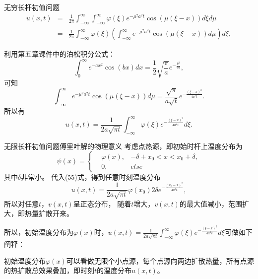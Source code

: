 \documentclass[11pt]{beamer}
\begin{document}
\begin{frame}{无穷长杆初值问题}
\begin{eqnarray}
u(x,t) &=& \frac{1}{2\pi} \int^\infty_{-\infty} \int^\infty_{-\infty} \varphi(\xi) e^{-\mu^2 a^2 t} \cos(\mu(\xi-x)) d\xi d\mu \nonumber\\
&=& \frac{1}{2\pi} \int^\infty_{-\infty} \varphi(\xi) (\int^\infty_{-\infty} e^{-\mu^2 a^2 t} \cos(\mu(\xi-x)) d\mu) d\xi,
\end{eqnarray}

利用第五章课件中的泊松积分公式：
\begin{equation}
\int^\infty_0 e^{-ax^2} \cos(bx) dx = \frac{1}{2} \sqrt{\frac{\pi}{a}} e^{-\frac{b^2}{4a}},
\end{equation}
可知
\begin{equation}
\int^\infty_{-\infty} e^{-\mu^2 a^2 t} \cos(\mu(\xi-x)) d\mu = \frac{\sqrt{\pi}}{a \sqrt{t}} e^{- \frac{(\xi-x)^2}{4 a^2 t}}.
\end{equation}
所以有
\begin{equation}
u(x,t) = \frac{1}{2a\sqrt{\pi t}} \int^\infty_{-\infty} \varphi(\xi) e^{- \frac{(\xi-x)^2}{4a^2 t}} d\xi.
\end{equation}

\end{frame}

\begin{frame}{无限长杆初值问题傅里叶解的物理意义}
考虑点热源，即初始时杆上温度分布为
\begin{equation}
\psi(x) = \left\{
\begin{aligned}
&\varphi(x), &-\delta + x_0 < x < x_0 + \delta, \\
&0, &else
\end{aligned}
\right.
\end{equation}
其中$\delta$非常小。
代入(55)式，得到任意时刻温度分布
\begin{equation}
u(x,t) = \frac{1}{2a\sqrt{\pi t}} \varphi(x_0) 2\delta e^{- \frac{(x_0 - x)^2}{4a^2 t}},
\end{equation}
所以对任意$t$，$v(x,t)$呈正态分布，
随着$t$增大，$v(x,t)$的最大值减小，范围扩大，即热量扩散开来。

所以，初始温度分布为$\varphi(x)$时，$u(x,t)= \frac{1}{2a\sqrt{\pi t}} \int^\infty_{-\infty} \varphi(\xi) e^{- \frac{(\xi-x)^2}{4a^2 t}} d\xi$可做如下阐释：

初始温度分布$\varphi(x)$可以看做无限个小点源，每个点源向两边扩散热量，所有点源的热扩散总效果叠加，即时刻$t$的温度分布$u(x,t)$。
\end{frame}
\end{document}
